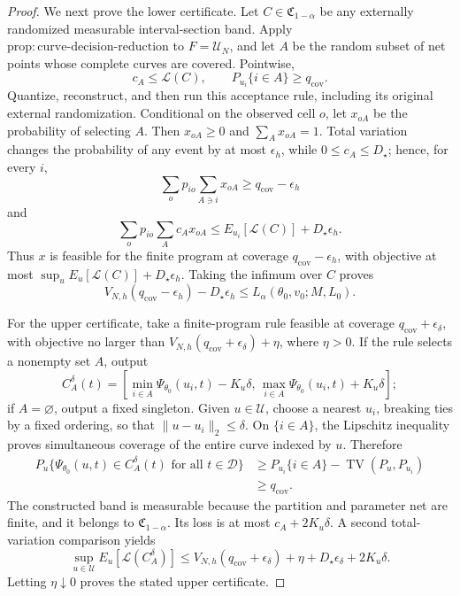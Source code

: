 \documentclass{article}
\begin{document}
\begin{proof}
We next prove the lower certificate.  Let \(C\in\mathfrak C_{1-\alpha}\) be any externally randomized measurable interval-section band.  Apply \(\mathrm{prop:curve\mbox{-}decision\mbox{-}reduction}\) to \(F=\mathcal U_N\), and let \(A\) be the random subset of net points whose complete curves are covered.  Pointwise,
\[
c_A\le\mathcal L(C),
\qquad
P_{u_i}\{i\in A\}\ge q_{\mathrm{cov}}.
\]
Quantize, reconstruct, and then run this acceptance rule, including its original external randomization.  Conditional on the observed cell \(o\), let \(x_{oA}\) be the probability of selecting \(A\).  Then \(x_{oA}\ge0\) and \(\sum_Ax_{oA}=1\).  Total variation changes the probability of any event by at most \(\epsilon_h\), while \(0\le c_A\le D_\star\); hence, for every \(i\),
\[
\sum_op_{io}\sum_{A\ni i}x_{oA}
\ge q_{\mathrm{cov}}-\epsilon_h
\]
and
\[
\sum_op_{io}\sum_Ac_Ax_{oA}
\le E_{u_i}[\mathcal L(C)]+D_\star\epsilon_h.
\]
Thus \(x\) is feasible for the finite program at coverage \(q_{\mathrm{cov}}-\epsilon_h\), with objective at most
\(\sup_uE_u[\mathcal L(C)]+D_\star\epsilon_h\).  Taking the infimum over \(C\) proves
\[
V_{N,h}(q_{\mathrm{cov}}-\epsilon_h)-D_\star\epsilon_h
\le L_\alpha(\theta_0,v_0;M,L_0).
\]

For the upper certificate, take a finite-program rule feasible at coverage \(q_{\mathrm{cov}}+\epsilon_\delta\), with objective no larger than
\(V_{N,h}(q_{\mathrm{cov}}+\epsilon_\delta)+\eta\), where \(\eta>0\).  If the rule selects a nonempty set \(A\), output
\[
C_A^\delta(t)=
\left[
\min_{i\in A}\Psi_{\theta_0}(u_i,t)-K_u\delta,\,
\max_{i\in A}\Psi_{\theta_0}(u_i,t)+K_u\delta
\right];
\]
if \(A=\varnothing\), output a fixed singleton.  Given \(u\in\mathcal U\), choose a nearest \(u_i\), breaking ties by a fixed ordering, so that \(\lVert u-u_i\rVert_2\le\delta\).  On \(\{i\in A\}\), the Lipschitz inequality proves simultaneous coverage of the entire curve indexed by \(u\).  Therefore
\[
\begin{aligned}
P_u\{\Psi_{\theta_0}(u,t)\in C_A^\delta(t)
\text{ for all }t\in\mathcal D\}
&\ge P_{u_i}\{i\in A\}
-\operatorname{TV}(P_u,P_{u_i})\\
&\ge q_{\mathrm{cov}}.
\end{aligned}
\]
The constructed band is measurable because the partition and parameter net are finite, and it belongs to \(\mathfrak C_{1-\alpha}\).  Its loss is at most \(c_A+2K_u\delta\).  A second total-variation comparison yields
\[
\sup_{u\in\mathcal U}E_u[\mathcal L(C_A^\delta)]
\le
V_{N,h}(q_{\mathrm{cov}}+\epsilon_\delta)
+\eta+D_\star\epsilon_\delta+2K_u\delta.
\]
Letting \(\eta\downarrow0\) proves the stated upper certificate.


\end{proof}
\end{document}
